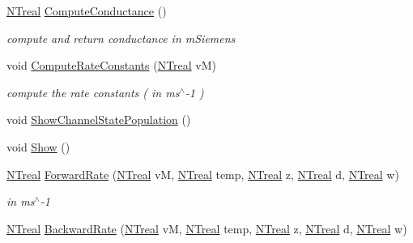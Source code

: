 \begin{DoxyCompactItemize}
\item 
\hyperlink{nt__types_8h_a814a97893e9deb1eedcc7604529ba80d}{NTreal} \hyperlink{class_n_t_b_p__patlak__sodium__multi__current__o_aac904afc195e4ddd7a2cb27454425853}{ComputeConductance} ()
\begin{DoxyCompactList}\small\item\em compute and return conductance in mSiemens \item\end{DoxyCompactList}\item 
void \hyperlink{class_n_t_b_p__patlak__sodium__multi__current__o_a405581d3dd6b263d89ba6d166add9b12}{ComputeRateConstants} (\hyperlink{nt__types_8h_a814a97893e9deb1eedcc7604529ba80d}{NTreal} vM)
\begin{DoxyCompactList}\small\item\em compute the rate constants ( in ms$^\wedge$-\/1 ) \item\end{DoxyCompactList}\item 
void \hyperlink{class_n_t_b_p__patlak__sodium__multi__current__o_a58615bf32153e48315a12ee7dee209a7}{ShowChannelStatePopulation} ()
\item 
void \hyperlink{class_n_t_b_p__patlak__sodium__multi__current__o_aef48cf5a7c15b2be04f0f53e4490dcec}{Show} ()
\item 
\hyperlink{nt__types_8h_a814a97893e9deb1eedcc7604529ba80d}{NTreal} \hyperlink{class_n_t_b_p__patlak__sodium__multi__current__o_a06e73e4e97248c3d7632dd94c7ed543f}{ForwardRate} (\hyperlink{nt__types_8h_a814a97893e9deb1eedcc7604529ba80d}{NTreal} vM, \hyperlink{nt__types_8h_a814a97893e9deb1eedcc7604529ba80d}{NTreal} temp, \hyperlink{nt__types_8h_a814a97893e9deb1eedcc7604529ba80d}{NTreal} z, \hyperlink{nt__types_8h_a814a97893e9deb1eedcc7604529ba80d}{NTreal} d, \hyperlink{nt__types_8h_a814a97893e9deb1eedcc7604529ba80d}{NTreal} w)
\begin{DoxyCompactList}\small\item\em in ms$^\wedge$-\/1 \item\end{DoxyCompactList}\item 
\hyperlink{nt__types_8h_a814a97893e9deb1eedcc7604529ba80d}{NTreal} \hyperlink{class_n_t_b_p__patlak__sodium__multi__current__o_a8a347eff641f66d9a66e81c3cb71ec4f}{BackwardRate} (\hyperlink{nt__types_8h_a814a97893e9deb1eedcc7604529ba80d}{NTreal} vM, \hyperlink{nt__types_8h_a814a97893e9deb1eedcc7604529ba80d}{NTreal} temp, \hyperlink{nt__types_8h_a814a97893e9deb1eedcc7604529ba80d}{NTreal} z, \hyperlink{nt__types_8h_a814a97893e9deb1eedcc7604529ba80d}{NTreal} d, \hyperlink{nt__types_8h_a814a97893e9deb1eedcc7604529ba80d}{NTreal} w)

\end{DoxyCompactItemize}

